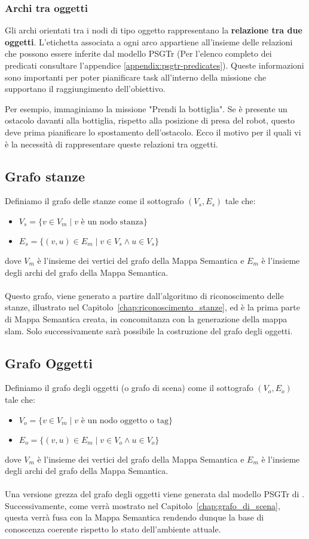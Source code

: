 \subsubsection{Archi tra oggetti}
Gli archi orientati tra i nodi di tipo oggetto rappresentano la \textbf{relazione tra due oggetti}. L'etichetta associata a ogni arco appartiene all'insieme delle relazioni che possono essere inferite dal modello PSGTr (Per l'elenco completo dei predicati consultare l'appendice \ref{appendix:psgtr-predicates}). Queste informazioni sono importanti per poter pianificare task all'interno della missione che supportano il raggiungimento dell'obiettivo.

Per esempio, immaginiamo la missione "Prendi la bottiglia". Se è presente un ostacolo davanti alla bottiglia, rispetto alla posizione di presa del robot, questo deve prima pianificare lo spostamento dell'ostacolo. Ecco il motivo per il quali vi è la necessità di rappresentare queste relazioni tra oggetti.

\subsection{Grafo stanze}
Definiamo il grafo delle stanze come il sottografo $(V_s, E_s)$ tale che:
\begin{itemize}
  \item $V_s = \{v \in V_m \mid v \text{ è un nodo stanza} \}$
  \item $E_s = \{(v,u) \in E_m \mid v \in V_s \wedge u \in V_s \}$
\end{itemize}
dove $V_m$ è l'insieme dei vertici del grafo della Mappa Semantica e $E_m$ è l'insieme degli archi del grafo della Mappa Semantica. \\\\
Questo grafo, viene generato a partire dall'algoritmo di riconoscimento delle stanze, illustrato nel Capitolo~\ref{chap:riconoscimento_stanze}, ed è la prima parte di Mappa Semantica creata, in concomitanza con la generazione della mappa slam. Solo successivamente sarà possibile la costruzione del grafo degli oggetti.
\subsection{Grafo Oggetti}
Definiamo il grafo degli oggetti (o grafo di scena) come il sottografo $(V_o, E_o)$ tale che:
\begin{itemize}
  \item $V_o = \{v \in V_m \mid v \text{ è un nodo oggetto o tag} \}$
  \item $E_o = \{(v,u) \in E_m \mid v \in V_o \wedge u \in V_o \}$
\end{itemize}
dove $V_m$ è l'insieme dei vertici del grafo della Mappa Semantica e $E_m$ è l'insieme degli archi del grafo della Mappa Semantica. \\\\
Una versione grezza del grafo degli oggetti viene generata dal modello PSGTr di \cite{yang2022psg}. Successivamente, come verrà mostrato nel Capitolo~\ref{chap:grafo_di_scena}, questa verrà fusa con la Mappa Semantica rendendo dunque la base di conoscenza coerente rispetto lo stato dell'ambiente attuale.

